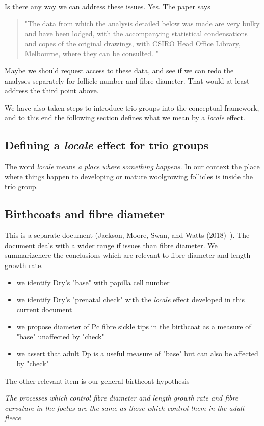 \documentclass[titlepage]{article}  %
\begin{document}
Is there any way we can address these issues. Yes. The paper says
\begin{quote}
"The data from which the analysis detailed below was made are very bulky and have been lodged, with the accompanying statistical condensations and copes of the original drawings, with CSIRO Head Office Library, Melbourne, where they can be consulted. "
\end{quote}
Maybe we should request access to these data, and see if we can redo the analyses separately for follicle number and fibre diameter. That would at least address the third point above.

We have also taken steps to introduce trio groups into the conceptual framework, and to this end the following section defines what we mean by a {\em locale} effect.

\subsection{Defining a {\em locale} effect for trio groups}
The word {\em locale} means {\em a place where something happens}.  In our context the place where things happen to developing or mature woolgrowing follicles is inside the trio group.

\subsection{Birthcoats and fibre diameter}
This is a separate document (Jackson, Moore, Swan, and Watts (2018)~\cite{jack:18b}). The document deals with a wider range if issues than fibre diameter. We summarizehere the conclusions which are relevant to fibre diameter and length growth rate.
\begin{itemize}
\item we identify Dry's "base" with papilla cell number
\item we identify Dry's "prenatal check" with the {\em locale} effect developed in this current document
\item we propose diameter of Pc fibre sickle tips in the birthcoat as a measure of "base" unaffected by "check"
\item we assert that adult Dp is a useful measure of "base" but can also be affected by "check"
\end{itemize}

The other relevant item is our general birthcoat hypothesis

{\em The processes which control fibre diameter and length growth rate and fibre curvature in the foetus are the same as those which control them in the adult fleece}
\end{document}
